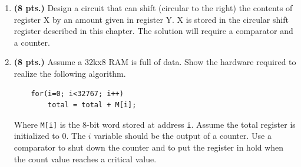 \begin{enumerate}
\item{\bf (8 pts.)} Design a circuit that can shift (circular 
to the right) the contents of register X by an amount given in 
register Y. X is stored in the circular shift register described 
in this chapter. The solution will require a comparator and a
counter.
\begin{solution} {
\begin{figure}[ht]
\end{figure}
} \end{solution}


\item{\bf (8 pts.)} Assume a 32kx8 RAM is full of data. Show 
the hardware required to realize the following algorithm. 
\begin{verbatim}
    for(i=0; i<32767; i++)
        total = total + M[i];
\end{verbatim}

Where \verb+M[i]+ is the 8-bit word stored at address \verb^i^. 
Assume the total register is initialized to 0. The $i$ variable should 
be the output of a counter. Use a comparator to shut down the counter 
and to put the register in hold when the count value reaches a critical 
value.  
\begin{solution} {
\begin{figure}[ht]
\end{figure}
} \end{solution}



\end{enumerate}

